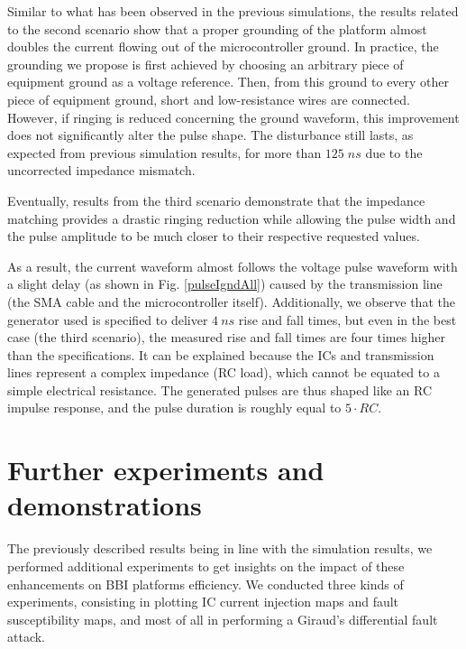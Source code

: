 \documentclass[10pt, conference, compsocconf]{IEEEtran}
\begin{document}
Similar to what has been observed in the previous simulations, the results related to the second scenario show that a proper grounding of the platform almost doubles the current flowing out of the microcontroller ground.
In practice, the grounding we propose is first achieved by choosing an arbitrary piece of equipment ground as a voltage reference.
Then, from this ground to every other piece of equipment ground, short and low-resistance wires are connected.
However, if ringing is reduced concerning the ground waveform, this improvement does not significantly alter the pulse shape.
The disturbance still lasts, as expected from previous simulation results, for more than $125 \; ns$ due to the uncorrected impedance mismatch.

Eventually, results from the third scenario demonstrate that the impedance matching provides a drastic ringing reduction while allowing the pulse width and the pulse amplitude to be much closer to their respective requested values.

As a result, the current waveform almost follows the voltage pulse waveform with a slight delay (as shown in Fig. \ref{pulseIgndAll}) caused by the transmission line (the SMA cable and the microcontroller itself).
Additionally, we observe that the generator used is specified to deliver $4 \: ns$ rise and fall times, but even in the best case (the third scenario), the measured rise and fall times are four times higher than the specifications.
It can be explained because the ICs and transmission lines represent a complex impedance (RC load), which cannot be equated to a simple electrical resistance.
The generated pulses are thus shaped like an RC impulse response, and the pulse duration is roughly equal to $5\cdot RC$.

\section{Further experiments and demonstrations}
\label{section:moreXP}

The previously described results being in line with the simulation results, we performed additional experiments to get insights on the impact of these enhancements on BBI platforms efficiency.
We conducted three kinds of experiments, consisting in plotting IC current injection maps and fault susceptibility maps, and most of all in performing a Giraud's differential fault attack.
\end{document}
